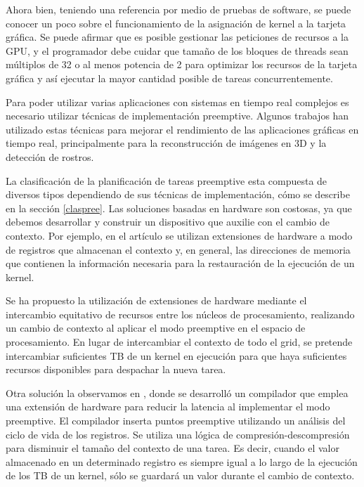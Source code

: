    Ahora bien, teniendo una referencia por medio de pruebas de software, se puede conocer un poco sobre el funcionamiento de la asignación de kernel a la tarjeta gráfica. Se puede afirmar que es posible gestionar las peticiones de recursos a la GPU, y el programador debe cuidar que tamaño de los bloques de threads sean múltiplos de 32 o al menos potencia de 2 para optimizar los recursos de la tarjeta gráfica y así ejecutar la mayor cantidad posible de tareas concurrentemente.
\newline
    
Para poder utilizar varias aplicaciones con sistemas en tiempo real complejos es necesario utilizar técnicas de implementación preemptive\cite{RGEM}. Algunos trabajos han utilizado estas técnicas para mejorar el rendimiento de las aplicaciones gráficas en tiempo real, principalmente para la reconstrucción de imágenes en 3D y la detección de rostros\cite{DynSche}.
\newline

La clasificación de la planificación de tareas preemptive esta compuesta de diversos tipos dependiendo de sus técnicas de implementación, cómo se describe en la sección \ref{claspree}. 
Las soluciones basadas en hardware son costosas, ya que debemos desarrollar y construir un dispositivo que auxilie con el cambio de contexto. Por ejemplo, en el artículo \cite{18} se utilizan extensiones de hardware a modo de registros que almacenan el contexto y, en general, las direcciones de memoria que contienen la información necesaria para la restauración de la ejecución de un kernel. 

\vspace{0.3cm}

Se ha propuesto\cite{20} la utilización de extensiones de hardware mediante el intercambio equitativo de recursos entre los núcleos de procesamiento, realizando un cambio de contexto al aplicar el modo preemptive en el espacio de procesamiento. En lugar de intercambiar el contexto de todo el grid, se pretende intercambiar suficientes TB de un kernel en ejecución para que haya suficientes recursos disponibles para despachar la nueva tarea. 

\vspace{0.3cm}

Otra solución la observamos en \cite{8}, donde se desarrolló un compilador que emplea una extensión de hardware para reducir la latencia al implementar el modo preemptive. El compilador inserta puntos preemptive utilizando un análisis del ciclo de vida de los registros. Se utiliza una lógica de compresión-descompresión para disminuir el tamaño del contexto de una tarea. Es decir, cuando el valor almacenado en un determinado registro es siempre igual a lo largo de la ejecución de los TB de un kernel, sólo se guardará un valor durante el cambio de contexto.
\newline

